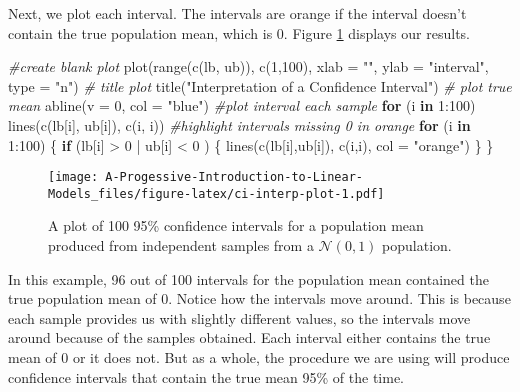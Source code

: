 \documentclass[
]{book}
\newenvironment{Shaded}{\begin{snugshade}}{\end{snugshade}}
\newcommand{\AttributeTok}[1]{\textcolor[rgb]{0.77,0.63,0.00}{#1}}
\newcommand{\CommentTok}[1]{\textcolor[rgb]{0.56,0.35,0.01}{\textit{#1}}}
\newcommand{\ControlFlowTok}[1]{\textcolor[rgb]{0.13,0.29,0.53}{\textbf{#1}}}
\newcommand{\DecValTok}[1]{\textcolor[rgb]{0.00,0.00,0.81}{#1}}
\newcommand{\FunctionTok}[1]{\textcolor[rgb]{0.00,0.00,0.00}{#1}}
\newcommand{\NormalTok}[1]{#1}
\newcommand{\SpecialCharTok}[1]{\textcolor[rgb]{0.00,0.00,0.00}{#1}}
\newcommand{\StringTok}[1]{\textcolor[rgb]{0.31,0.60,0.02}{#1}}
\theoremstyle{definition}
\theoremstyle{definition}
\theoremstyle{definition}
\theoremstyle{definition}
\theoremstyle{remark}
\begin{document}
Next, we plot each interval. The intervals are orange if the
interval doesn't contain the true population mean, which is 0. Figure \ref{fig:ci-interp-plot} displays our results.

\begin{Shaded}
\begin{Highlighting}[]
\CommentTok{\#create blank plot}
\FunctionTok{plot}\NormalTok{(}\FunctionTok{range}\NormalTok{(}\FunctionTok{c}\NormalTok{(lb, ub)), }\FunctionTok{c}\NormalTok{(}\DecValTok{1}\NormalTok{,}\DecValTok{100}\NormalTok{),}
     \AttributeTok{xlab =} \StringTok{""}\NormalTok{, }\AttributeTok{ylab =} \StringTok{"interval"}\NormalTok{, }\AttributeTok{type =} \StringTok{"n"}\NormalTok{)}
\CommentTok{\# title plot}
\FunctionTok{title}\NormalTok{(}\StringTok{"Interpretation of a Confidence Interval"}\NormalTok{)}
\CommentTok{\# plot true mean}
\FunctionTok{abline}\NormalTok{(}\AttributeTok{v =} \DecValTok{0}\NormalTok{, }\AttributeTok{col =} \StringTok{"blue"}\NormalTok{)}
\CommentTok{\#plot interval each sample}
\ControlFlowTok{for}\NormalTok{ (i }\ControlFlowTok{in} \DecValTok{1}\SpecialCharTok{:}\DecValTok{100}\NormalTok{) }\FunctionTok{lines}\NormalTok{(}\FunctionTok{c}\NormalTok{(lb[i], ub[i]), }\FunctionTok{c}\NormalTok{(i, i))}
\CommentTok{\#highlight intervals missing 0 in orange}
\ControlFlowTok{for}\NormalTok{ (i }\ControlFlowTok{in} \DecValTok{1}\SpecialCharTok{:}\DecValTok{100}\NormalTok{) \{}
  \ControlFlowTok{if}\NormalTok{ (lb[i] }\SpecialCharTok{\textgreater{}} \DecValTok{0} \SpecialCharTok{|}\NormalTok{ ub[i] }\SpecialCharTok{\textless{}} \DecValTok{0}\NormalTok{ )   \{}
    \FunctionTok{lines}\NormalTok{(}\FunctionTok{c}\NormalTok{(lb[i],ub[i]), }\FunctionTok{c}\NormalTok{(i,i), }\AttributeTok{col =} \StringTok{"orange"}\NormalTok{)}
\NormalTok{  \}}
\NormalTok{\}}
\end{Highlighting}
\end{Shaded}

\begin{figure}
\centering
\texttt{[image: A-Progessive-Introduction-to-Linear-Models\_files/figure-latex/ci-interp-plot-1.pdf]}
\caption{\label{fig:ci-interp-plot}A plot of 100 95\% confidence intervals for a population mean produced from independent samples from a \(\mathcal{N}(0,1)\) population.}
\end{figure}

In this example, 96 out of 100 intervals for the population mean contained the true population mean of 0. Notice how the intervals move around. This is because each sample provides us with slightly different values, so the intervals move around because of the samples obtained. Each interval either contains the true mean of 0 or it does not. But as a whole, the procedure we are using will produce confidence intervals that contain the true mean 95\% of the time.
\end{document}
